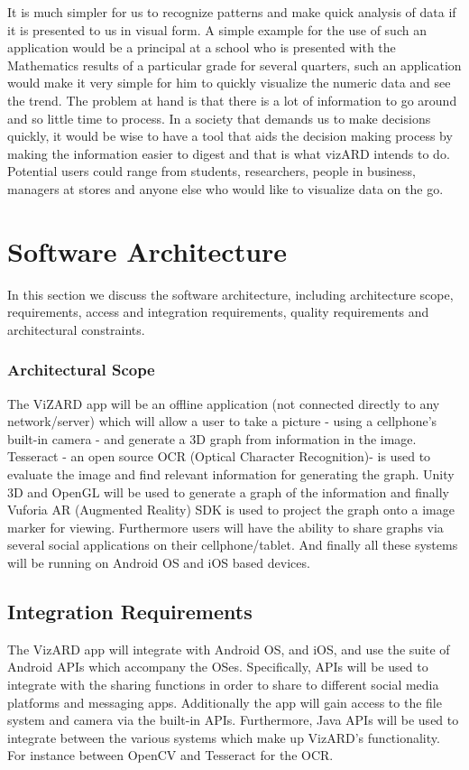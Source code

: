 \documentclass[a4paper,12pt]{article}
\begin{document}
It is much simpler for us to recognize patterns and make quick analysis of data if it is presented to us in visual form. A simple example for the use of such an application would be a principal at a school who is presented with the Mathematics results of a particular grade for several quarters, such an application would make it very simple for him to quickly visualize the numeric data and see the trend.
\newline
\newline
The problem at hand is that there is a lot of information to go around and so little time to process. In a society that demands us to make decisions quickly, it would be wise to have a tool that aids the decision making process by making the information easier to digest and that is what vizARD intends to do.
\newline
\newline
Potential users could range from students, researchers, people in business, managers at stores and anyone else who would like to visualize data on the go.
		

\newpage
\section{Software Architecture}
In this section we discuss the software architecture, including architecture scope, requirements, access and integration requirements, quality requirements and architectural constraints.

\subsubsection{Architectural Scope}
The ViZARD app will be an offline application (not connected directly to any network/server) which will allow a user to take a picture - using a cellphone's built-in camera - and generate a 3D graph from information in the image. Tesseract - an open source OCR (Optical Character Recognition)- is used to evaluate the image and find relevant information for generating the graph. 
Unity 3D and OpenGL will be used to generate a graph of the information and finally Vuforia AR (Augmented Reality) SDK is used to project the graph onto a image marker for viewing.
Furthermore users will have the ability to share graphs via several social applications on their cellphone/tablet.
And finally all these systems will be running on Android OS and iOS based devices.

\subsection{Integration Requirements}
The VizARD app will integrate with Android OS, and iOS, and use the suite of Android APIs which accompany the OSes. Specifically, APIs will be used to integrate with the sharing functions in order to share to different social media platforms and messaging apps. Additionally the app will gain access to the file system and camera via the built-in APIs. Furthermore, Java APIs will be used to integrate between the various systems which make up VizARD's functionality. For instance between OpenCV and Tesseract for the OCR.
\end{document}
